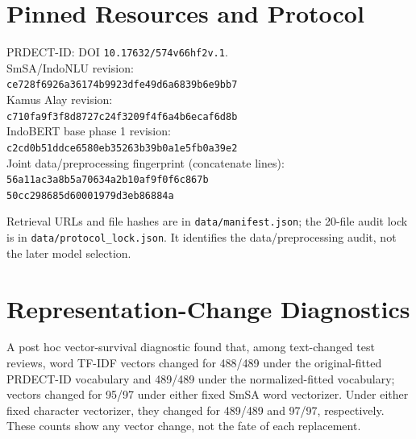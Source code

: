 \documentclass[conference]{IEEEtran}
\begin{document}
\section*{Pinned Resources and Protocol}
\begingroup\small
\noindent PRDECT-ID: DOI \texttt{10.17632/574v66hf2v.1}.\\
SmSA/IndoNLU revision:\\
\texttt{ce728f6926a36174b9923dfe49d6a6839b6e9bb7}\\
Kamus Alay revision:\\
\texttt{c710fa9f3f8d8727c24f3209f4f6a4b6ecaf6d8b}\\
IndoBERT base phase 1 revision:\\
\texttt{c2cd0b51ddce6580eb35263b39b0a1e5fb0a39e2}\\
Joint data/preprocessing fingerprint (concatenate lines):\\
\texttt{56a11ac3a8b5a70634a2b10af9f0f6c867b}\\
\texttt{50cc298685d60001979d3eb86884a}
\par\endgroup
Retrieval URLs and file hashes are in \texttt{data/manifest.json}; the 20-file audit lock is in \texttt{data/protocol\_lock.json}. It identifies the data/preprocessing audit, not the later model selection.

\section*{Representation-Change Diagnostics}
A post hoc vector-survival diagnostic found that, among text-changed test reviews, word TF-IDF vectors changed for 488/489 under the original-fitted PRDECT-ID vocabulary and 489/489 under the normalized-fitted vocabulary; vectors changed for 95/97 under either fixed SmSA word vectorizer. Under either fixed character vectorizer, they changed for 489/489 and 97/97, respectively. These counts show any vector change, not the fate of each replacement.

\renewcommand{\thetable}{S\arabic{table}}
\end{document}
